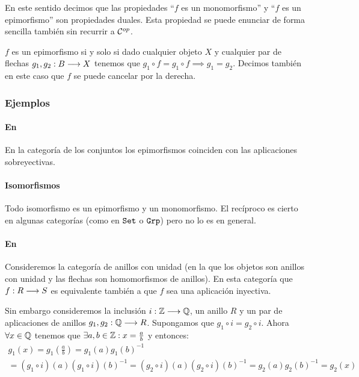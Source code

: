 En este sentido decimos que las propiedades ``$f$ es un monomorfismo''
y ``$f$ es un epimorfismo'' son propiedades duales. Esta propiedad
se puede enunciar de forma sencilla también sin recurrir a
$\mathcal{C}^{op}$.

\begin{proposition}
$f$ es un epimorfismo si y solo si dado cualquier objeto $X$ y
cualquier par de flechas $g_1, g_2 : B\longrightarrow X$
tenemos que $g_1 \circ f = g_1 \circ f \implies g_1 = g_2$.
Decimos también en este caso que $f$ se puede cancelar por la
derecha.
\end{proposition}

\subsubsection{Ejemplos}
\paragraph{En \Set}
En la categoría de los conjuntos los epimorfismos coinciden con las
aplicaciones sobreyectivas.

\paragraph{Isomorfismos}
Todo isomorfismo es un epimorfismo y un monomorfismo. El recíproco
es cierto en algunas categorías (como en $\texttt{Set}$ o $\texttt{Grp}$) pero no
lo es en general.

\paragraph{En \Ring}
Consideremos la categoría de anillos con unidad (en la
que los objetos son anillos con unidad y
las flechas son homomorfismos de anillos). En esta categoría
que $f : R\longrightarrow S$ es equivalente también a que $f$ sea una aplicación
inyectiva.

Sin embargo consideremos la inclusión
$i : \mathbb{Z}\longrightarrow \mathbb{Q}$, un anillo $R$
y un par de aplicaciones de anillos $g_1, g_2 : \mathbb{Q}\longrightarrow R$. Supongamos
que $g_1 \circ i = g_2 \circ i$. Ahora  $\forall x \in \mathbb{Q}$
tenemos que $\exists a, b \in \mathbb{Z} : x = \frac{a}{b}$ y entonces:
\begin{multline*}
g_1(x) = g_1(\frac{a}{b}) = g_1(a)g_1(b)^{-1} \\
       = (g_1 \circ i)(a)(g_1\circ i)(b)^{-1}
       = (g_2\circ i)(a)(g_2\circ i)(b)^{-1}
       = g_2(a)g_2(b)^{-1} = g_2(x)
\end{multline*}

